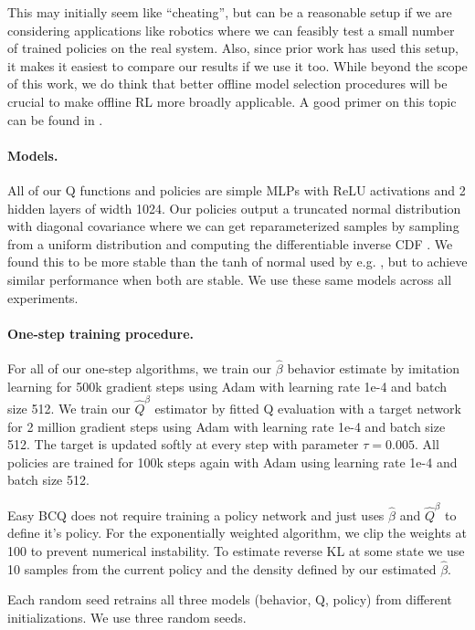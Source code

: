 This may initially seem like ``cheating'', but can be a reasonable setup if we are considering applications like robotics where we can feasibly test a small number of trained policies on the real system. Also, since prior work has used this setup, it makes it easiest to compare our results if we use it too. While beyond the scope of this work, we do think that better offline model selection procedures will be crucial to make offline RL more broadly applicable. A good primer on this topic can be found in \cite{paine2020hyperparameter}.


\paragraph{Models.} All of our Q functions and policies are simple MLPs with ReLU activations and 2 hidden layers of width 1024. Our policies output a truncated normal distribution with diagonal covariance where we can get reparameterized samples by sampling from a uniform distribution and computing the differentiable inverse CDF \citep{Burkhardt2014truncated}. We found this to be more stable than the tanh of normal used by e.g. \cite{fu2020d4rl}, but to achieve similar performance when both are stable. We use these same models across all experiments.


\paragraph{One-step training procedure.} For all of our one-step algorithms, we train our $ \hat \beta $ behavior estimate by imitation learning for 500k gradient steps using Adam \citep{kingma2014adam} with learning rate 1e-4 and batch size 512. We train our $ \widehat Q^\beta$ estimator by fitted Q evaluation with a target network for 2 million gradient steps using Adam with learning rate 1e-4 and batch size 512. The target is updated softly at every step with parameter $ \tau = 0.005$. All policies are trained for 100k steps again with Adam using learning rate 1e-4 and batch size 512.

Easy BCQ does not require training a policy network and just uses $ \hat \beta$ and $ \widehat Q^\beta$ to define it's policy. For the exponentially weighted algorithm, we clip the weights at 100 to prevent numerical instability. To estimate reverse KL at some state we use 10 samples from the current policy and the density defined by our estimated $ \hat \beta$.

Each random seed retrains all three models (behavior, Q, policy) from different initializations. We use three random seeds.

